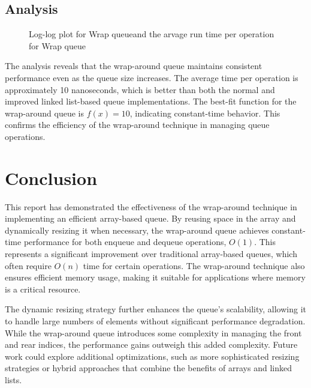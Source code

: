 \subsection*{Analysis}
\begin{figure}[h]
    \centering
    \caption{Log-log plot for Wrap queueand the arvage run time per operation for Wrap queue}
    \label{fig:wrap_linked_comparison}
\end{figure}
The analysis reveals that the wrap-around queue maintains consistent performance even as the queue size increases. The average time per operation is approximately 10 nanoseconds, which is better than both the normal and improved linked list-based queue implementations. The best-fit function for the wrap-around queue is $f(x)=10$, indicating constant-time behavior. This confirms the efficiency of the wrap-around technique in managing queue operations.

\section*{Conclusion}
This report has demonstrated the effectiveness of the wrap-around technique in implementing an efficient array-based queue. By reusing space in the array and dynamically resizing it when necessary, the wrap-around queue achieves constant-time performance for both enqueue and dequeue operations, $O(1)$. This represents a significant improvement over traditional array-based queues, which often require $O(n)$ time for certain operations. The wrap-around technique also ensures efficient memory usage, making it suitable for applications where memory is a critical resource.

The dynamic resizing strategy further enhances the queue's scalability, allowing it to handle large numbers of elements without significant performance degradation. While the wrap-around queue introduces some complexity in managing the front and rear indices, the performance gains outweigh this added complexity. Future work could explore additional optimizations, such as more sophisticated resizing strategies or hybrid approaches that combine the benefits of arrays and linked lists.


